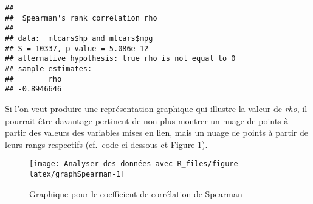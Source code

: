 \documentclass[
  french,
]{book}
\newenvironment{Shaded}{\begin{snugshade}}{\end{snugshade}}
\newcommand{\DataTypeTok}[1]{\textcolor[rgb]{0.13,0.29,0.53}{#1}}
\newcommand{\KeywordTok}[1]{\textcolor[rgb]{0.13,0.29,0.53}{\textbf{#1}}}
\newcommand{\NormalTok}[1]{#1}
\newcommand{\OperatorTok}[1]{\textcolor[rgb]{0.81,0.36,0.00}{\textbf{#1}}}
\newcommand{\OtherTok}[1]{\textcolor[rgb]{0.56,0.35,0.01}{#1}}
\newcommand{\StringTok}[1]{\textcolor[rgb]{0.31,0.60,0.02}{#1}}
\begin{document}
\begin{Shaded}
\end{Shaded}

\begin{verbatim}
## 
##  Spearman's rank correlation rho
## 
## data:  mtcars$hp and mtcars$mpg
## S = 10337, p-value = 5.086e-12
## alternative hypothesis: true rho is not equal to 0
## sample estimates:
##        rho 
## -0.8946646
\end{verbatim}

Si l'on veut produire une représentation graphique qui illustre la valeur de \emph{rho}, il pourrait être davantage pertinent de non plus montrer un nuage de points à partir des valeurs des variables mises en lien, mais un nuage de points à partir de leurs rangs respectifs (cf.~code ci-dessous et Figure \ref{fig:graphSpearman}).

\begin{Shaded}
\end{Shaded}

\begin{figure}

{\centering \texttt{[image: Analyser-des-données-avec-R\_files/figure-latex/graphSpearman-1]} 

}

\caption{Graphique pour le coefficient de corrélation de Spearman}\label{fig:graphSpearman}
\end{figure}
\end{document}
